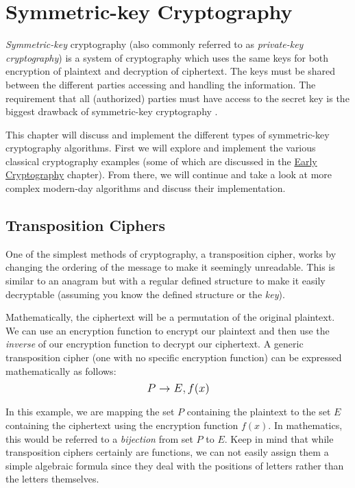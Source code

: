 \chapter{Symmetric-key Cryptography} %
\label{Symmetric-key Cryptography} %


\textit{Symmetric-key} cryptography (also commonly referred to as \textit{private-key cryptography}) is a system of cryptography which
uses the same keys for both encryption of plaintext and decryption of ciphertext. The keys must be shared between the different
parties accessing and handling the information. The requirement that all (authorized) parties must have access to the secret key
is the biggest drawback of symmetric-key cryptography \cite{wiki:symmetric_key_cryptography}.     

This chapter will discuss and implement the different types of symmetric-key cryptography algorithms. 
First we will explore and implement the various classical cryptography examples (some of which are discussed in the 
\hyperref[Early Cryptography]{Early Cryptography} chapter). From there, we will continue and take a look at more complex modern-day algorithms 
and discuss their implementation. 

\section{Transposition Ciphers}

One of the simplest methods of cryptography, a transposition cipher, works by changing the ordering of the message to make it seemingly unreadable.
This is similar to an anagram but with a regular defined structure to make it easily decryptable (assuming you know the defined structure or the \textit{key}).   

Mathematically, the ciphertext will be a permutation of the original plaintext. We can use an encryption function to encrypt our plaintext and then use 
the \textit{inverse} of our encryption function to decrypt our ciphertext. A generic transposition cipher (one with no specific encryption function) 
can be expressed mathematically as follows: $$\mathlarger{P \rightarrow E, f(x)}$$

In this example, we are mapping the set $P$ containing the plaintext to the set $E$ containing the ciphertext using the encryption function $f(x)$. 
In mathematics, this would be referred to a \textit{bijection} from set $P$ to $E$. Keep in mind that while transposition ciphers certainly
are functions, we can not easily assign them a simple algebraic formula since they deal with the positions of letters rather than the letters themselves.

